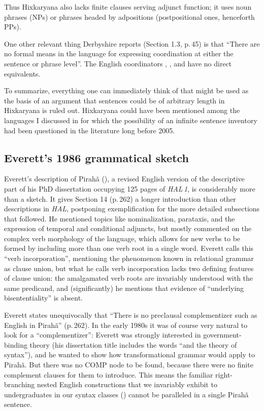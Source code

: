 \documentclass[output=paper,colorlinks,citecolor=brown
]{langscibook}
\begin{document}
\noindent
Thus Hixkaryana also lacks finite clauses serving adjunct function;
it uses noun phrases (NPs) or phrases headed by adpositions
(postpositional ones, henceforth PPs).

One other relevant thing Derbyshire reports (Section 1.3, p.\,45) is that
``There are no formal means in the language for expressing coordination at
either the sentence or phrase level''. The English coordinators ,
, and  have no direct equivalents.

To summarize, everything one can immediately think of that might be used
as the basis of an argument that sentences could be of arbitrary length
in Hixkaryana is ruled out. Hixkaryana could have been mentioned among
the languages I discussed in  for which the possibility
of an infinite sentence inventory had been questioned in the literature
long before 2005.

\subsection{Everett's 1986 grammatical sketch}

Everett's description of Pirahã (\citeyear{Everett86HAL}), a revised
English version of the descriptive part of his PhD dissertation occupying
125 pages of \textit{HAL\,1}, is considerably more than a sketch. It
gives Section 14 (p.\,262) a longer introduction than other descriptions
in \textit{HAL}, postponing exemplification for the more detailed
subsections that followed. He mentioned topics like nominalization,
parataxis, and the expression of temporal and conditional adjuncts, but mostly commented on the complex verb morphology of the
language, which allows for new verbs to be formed by including more
than one verb root in a single word. Everett calls this ``verb
incorporation'', mentioning the phenomenon known in relational grammar
as clause union, but what he calls verb incorporation lacks two
defining features of clause union: the amalgamated verb roots are
invariably understood with the same predicand, and (significantly)
he mentions that evidence of ``underlying bisententiality'' is absent.

Everett states unequivocally that ``There is no preclausal complementizer
such as English  in Pirahã'' (p.\,262). In the early 1980s
it was of course very natural to look for a ``complementizer'': Everett
was strongly interested in government-binding theory (his dissertation
title includes the words ``and the theory of syntax''), and he wanted to
show how transformational grammar would apply to Pirahã. But there
was no COMP node to be found, because there were no finite complement
clauses for them to introduce. This means the familiar right-branching
nested English constructions that we invariably exhibit to undergraduates
in our syntax classes ()
cannot be paralleled in a single Pirahã sentence.
\end{document}
